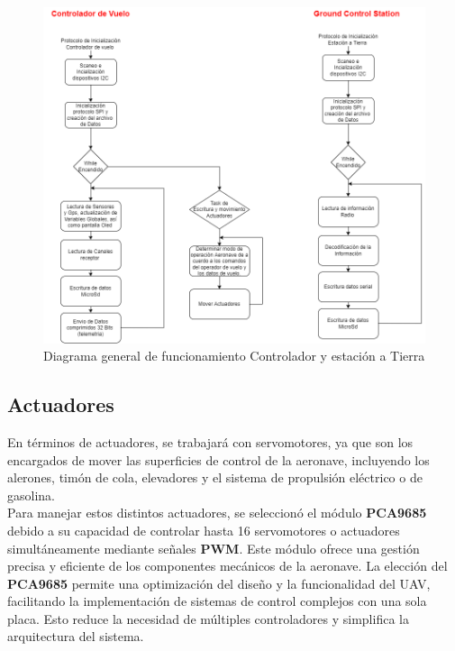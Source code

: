         \begin{figure}[H]
            \centering
            \includegraphics[width=\textwidth]{Imagenes/Interfaz/diagrama general de codigo.png}
            \caption{Diagrama general de funcionamiento Controlador y estación a Tierra }
            \label{fig:diag-codigo }
        \end{figure}




\subsection{Actuadores}


    En términos de actuadores, se trabajará con servomotores, ya que son los encargados de mover las superficies de control de la aeronave, incluyendo los alerones, timón de cola, elevadores y el sistema de propulsión eléctrico o de gasolina. \\ 

    Para manejar estos distintos actuadores, se seleccionó el módulo \textbf{PCA9685} debido a su capacidad de controlar hasta 16 servomotores o actuadores simultáneamente mediante señales \textbf{PWM}. Este módulo ofrece una gestión precisa y eficiente de los componentes mecánicos de la aeronave. La elección del \textbf{PCA9685} permite una optimización del diseño y la funcionalidad del UAV, facilitando la implementación de sistemas de control complejos con una sola placa. Esto reduce la necesidad de múltiples controladores y simplifica la arquitectura del sistema. \\ \\

